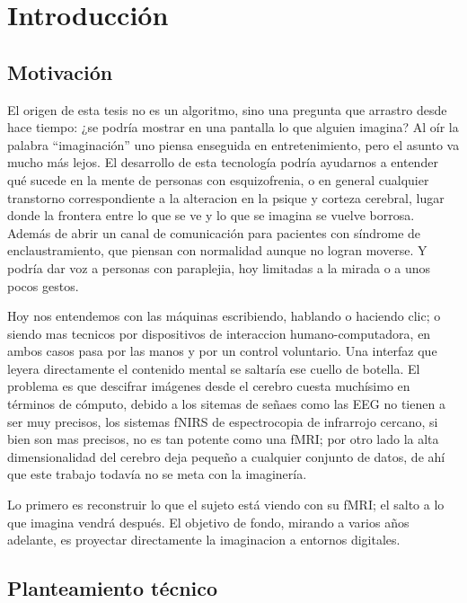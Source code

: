 \chapter{Introducción}

\section{Motivación}

El origen de esta tesis no es un algoritmo, sino una pregunta que arrastro desde hace 
tiempo: ¿se podría mostrar en una pantalla lo que alguien imagina? Al oír la palabra 
``imaginación'' uno piensa enseguida en entretenimiento, pero el asunto va mucho más 
lejos. El desarrollo de esta tecnología podría ayudarnos a entender qué sucede en la 
mente de personas con esquizofrenia, o en general cualquier transtorno correspondiente 
a la alteracion en la psique y corteza cerebral, lugar donde la frontera entre lo que 
se ve y lo que se imagina se vuelve borrosa. Además de abrir un canal de comunicación 
para pacientes con síndrome de enclaustramiento, que piensan con normalidad aunque no 
logran moverse. Y podría dar voz a personas con paraplejia, hoy limitadas a la mirada 
o a unos pocos gestos. 

Hoy nos entendemos con las máquinas escribiendo, hablando o haciendo clic; o siendo 
mas tecnicos por dispositivos de interaccion humano-computadora, en ambos casos pasa 
por las manos y por un control voluntario. Una interfaz que leyera directamente el 
contenido mental se saltaría ese cuello de botella. El problema es que descifrar 
imágenes desde el cerebro cuesta muchísimo en términos de cómputo, debido a los sitemas
de señaes como las EEG no tienen a ser muy precisos, los sistemas fNIRS de espectrocopia
de infrarrojo cercano, si bien son mas precisos, no es tan potente como una fMRI;
por otro lado la alta dimensionalidad del cerebro deja pequeño a cualquier conjunto de 
datos, de ahí que este trabajo todavía no se meta con la imaginería. 

Lo primero es reconstruir lo que el sujeto está viendo con su fMRI; el salto a lo que
imagina vendrá después. El objetivo de fondo, mirando a varios años adelante, es 
proyectar directamente la imaginacion a entornos digitales.

\section{Planteamiento técnico}

